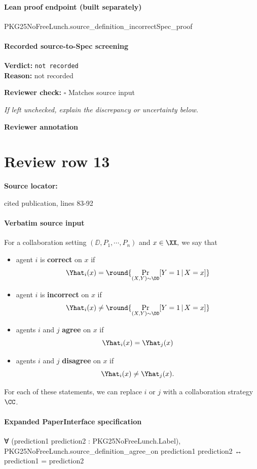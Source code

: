 \documentclass[10pt]{article}
\newcommand{\reviewerbox}{%
  \par\noindent\fbox{\parbox{0.96\linewidth}{\rule{0pt}{0.38in}}}\par
}
\newcommand{\reviewmatch}[1]{%
  \par\noindent\textbf{Reviewer check:} $\square$\; #1\par
  \noindent\emph{If left unchecked, explain the discrepancy or uncertainty below.}\par
}
\begin{document}
\paragraph{Lean proof endpoint (built separately)}\begin{ReviewVerbatim}
PKG25NoFreeLunch.source_definition_incorrectSpec_proof
\end{ReviewVerbatim}

\paragraph{Recorded source-to-Spec screening}
\textbf{Verdict:} \texttt{not recorded}
\\
\textbf{Reason:} not recorded
\reviewmatch{Matches source input}
\noindent\textbf{Reviewer annotation}\par
\reviewerbox
\clearpage
\hypertarget{source-claim-df70754e8844c37d}{}
\section*{Review row 13}
\textbf{Source locator:} {\footnotesize\raggedright cited publication, lines 83-\allowbreak{}92\par}
\paragraph{Verbatim source input}
\begin{ReviewVerbatim}
\begin{definition}\label{def:correct}
For a collaboration setting $(\DD, P_1,\cdots,P_n)$ and $x\in \XX,$ we say that
\begin{itemize}
    \item agent $i$ is \textbf{correct} on $x$ if $$\Yhat_i(x) = \round{\Pr_{(X,Y)\sim \DD}[Y=1\,|\,X=x]}$$
    \item agent $i$ is \textbf{incorrect} on $x$ if $$\Yhat_i(x) \neq \round{\Pr_{(X,Y)\sim \DD}[Y=1\,|\,X=x]}$$
    \item agents $i$ and $j$ \textbf{agree} on $x$ if $$\Yhat_i(x) = \Yhat_j(x)$$
    \item agents $i$ and $j$ \textbf{disagree} on $x$ if $$\Yhat_i(x) \neq \Yhat_j(x).$$
\end{itemize}
For each of these statements, we can replace $i$ or $j$ with a collaboration strategy $\CC$.
\end{definition}
\end{ReviewVerbatim}


\paragraph{Expanded PaperInterface specification}
\begin{ReviewVerbatim}
∀ (prediction1 prediction2 : PKG25NoFreeLunch.Label),
  PKG25NoFreeLunch.source_definition_agree_on prediction1 prediction2 ↔ prediction1 = prediction2
\end{ReviewVerbatim}
\end{document}
